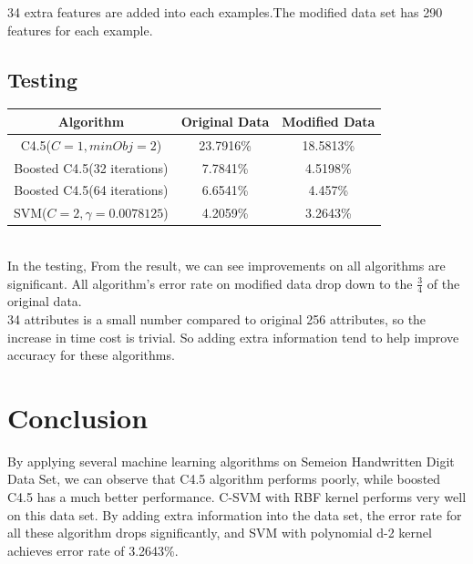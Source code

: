 \documentclass[a4paper,11pt]{article}
\begin{document}
34 extra features are added into each examples.The modified data set has 290 features for each example.
\subsection{Testing}
\vspace{0.5cm}
\begin{tabular}{c c c}
Algorithm		&	Original Data	&Modified Data\\
\hline \hline
C4.5($C=1, minObj=2$)           &23.7916\%		& 18.5813\%\\
Boosted C4.5(32 iterations)	    &7.7841\%		& 4.5198\%\\
Boosted C4.5(64 iterations)	    &6.6541\%		& 4.457\%\\
SVM($C=2, \gamma=0.0078125$)	&4.2059\%       & 3.2643\%\\
\end{tabular}
\vspace{0.5cm}\\
In the testing, From the result, we can see improvements on all algorithms are significant. All algorithm's error rate on modified data drop down to the $\frac{3}{4}$ of the original data.\\
 34 attributes is a small number compared to original 256 attributes, so the increase in time cost is trivial. So adding extra information tend to help improve accuracy for these algorithms.
\section{Conclusion}
By applying several machine learning algorithms on Semeion Handwritten Digit Data Set, we can observe that C4.5 algorithm performs poorly, while boosted C4.5 has a much better performance. C-SVM with RBF kernel performs very well on this data set. By adding extra information into the data set, the error rate for all these algorithm drops significantly, and SVM with polynomial d-2 kernel achieves error rate of 3.2643\%.



\end{document}
